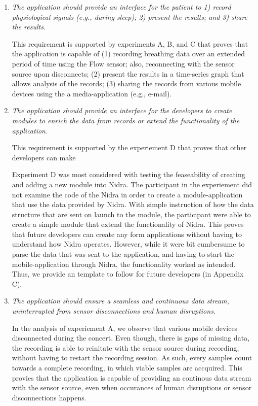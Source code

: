 \begin{enumerate}
    \item \textit{The application should provide an interface for the patient to 1) record physiological signals (e.g., during sleep); 2) present the results; and 3) share the results.}
    
    This requirement is supported by experiments A, B, and C that proves that the application is capable of (1) recording breathing data over an extended period of time using the Flow sensor; also, reconnecting with the sensor source upon disconnects; (2) present the results in a time-series graph that allows analysis of the records; (3) sharing the records from various mobile devices using the a media-application (e.g., e-mail).

    \item \textit{The application should provide an interface for the developers to create modules to enrich the data from records or extend the functionality of the application.}
    
    This requirement is supported by the experiement D that proves that other developers can make 

    Experiment D was most considered with testing the feaseability of creating and adding a new module into Nidra. The participant in the experiement did not examine the code of the Nidra in order to create a module-application that use the data provided by Nidra. With simple instruction of how the data structure that are sent on launch to the module, the participant were able to create a simple module that extend the functionality of Nidra. This proves that future developers can create any form applications without having to understand how Nidra operates. However, while it were bit cumbersume to parse the data that was sent to the application, and having to start the mobile-application through Nidra, the functionality worked as intended. Thus, we provide an template to follow for future developers (in Appendix C). 
    
    \item \textit{The application should ensure a seamless and continuous data stream, uninterrupted from sensor disconnections and human disruptions.}
    
    In the analysis of experiement A, we observe that various mobile devices disconnected during the concert. Even though, there is gaps of missing data, the recording is able to reinitate with the sensor source during recording, without having to restart the recording session. As such, every samples count towards a complete recording, in which viable samples are accquired. This provies that the application is capable of providing an continous data stream with the sensor source, even when occurances of human disruptions or sensor disconnections happens. 
    
\end{enumerate}

